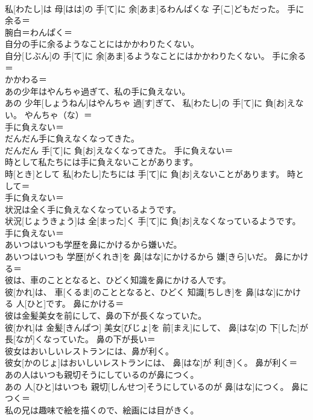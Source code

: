 \documentclass[8pt]{extreport}
\begin{document}
\begin{CJK}{UTF8}{min}
\\	私[わたし]は 母[はは]の 手[て]に 余[あま]るわんぱくな 子[こ]どもだった。	手に余る＝ 
\\	腕白＝わんぱく＝ 
\\	自分の手に余るようなことにはかかわりたくない。	
\\	自分[じぶん]の 手[て]に 余[あま]るようなことにはかかわりたくない。	手に余る＝ 
\\	かかわる＝ 
\\	あの少年はやんちゃ過ぎて、私の手に負えない。	
\\	あの 少年[しょうねん]はやんちゃ 過[す]ぎて、 私[わたし]の 手[て]に 負[お]えない。	やんちゃ（な）＝ 
\\	手に負えない＝ 
\\	だんだん手に負えなくなってきた。	
\\	だんだん 手[て]に 負[お]えなくなってきた。	手に負えない＝ 
\\	時として私たちには手に負えないことがあります。	
\\	時[とき]として 私[わたし]たちには 手[て]に 負[お]えないことがあります。	時として＝ 
\\	手に負えない＝ 
\\	状況は全く手に負えなくなっているようです。	
\\	状況[じょうきょう]は 全[まった]く 手[て]に 負[お]えなくなっているようです。	手に負えない＝ 
\\	あいつはいつも学歴を鼻にかけるから嫌いだ。	
\\	あいつはいつも 学歴[がくれき]を 鼻[はな]にかけるから 嫌[きら]いだ。	鼻にかける＝ 
\\	彼は、車のこととなると、ひどく知識を鼻にかける人です。	
\\	彼[かれ]は、 車[くるま]のこととなると、ひどく 知識[ちしき]を 鼻[はな]にかける 人[ひと]です。	鼻にかける＝ 
\\	彼は金髪美女を前にして、鼻の下が長くなっていた。	
\\	彼[かれ]は 金髪[きんぱつ] 美女[びじょ]を 前[まえ]にして、 鼻[はな]の 下[した]が 長[なが]くなっていた。	鼻の下が長い＝ 
\\	彼女はおいしいレストランには、鼻が利く。	
\\	彼女[かのじょ]はおいしいレストランには、 鼻[はな]が 利[き]く。	鼻が利く＝ 
\\	あの人はいつも親切そうにしているのが鼻につく。	
\\	あの 人[ひと]はいつも 親切[しんせつ]そうにしているのが 鼻[はな]につく。	鼻につく＝ 
\\	私の兄は趣味で絵を描くので、絵画には目がきく。	

\end{CJK}
\end{document}
